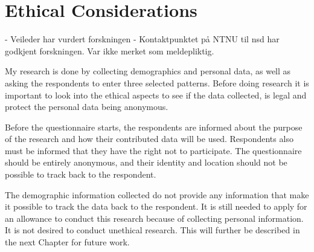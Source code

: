\section{Ethical Considerations}\label{sec:ethics}
    
    - Veileder har vurdert forskningen
    - Kontaktpunktet på NTNU til nsd har godkjent forskningen. Var ikke merket som meldepliktig.

    My research is done by collecting demographics and personal data, as well as asking the respondents to enter three selected patterns. Before doing research it is important to look into the ethical aspects to see if the data collected, is legal and protect the personal data being anonymous.

    Before the questionnaire starts, the respondents are informed about the purpose of the research and how their contributed data will be used. Respondents also must be informed that they have the right not to participate. The questionnaire should be entirely anonymous, and their identity and location should not be possible to track back to the respondent.

    The demographic information collected do not provide any information that make it possible to track the data back to the respondent. It is still needed to apply for an allowance to conduct this research because of collecting personal information. It is not desired to conduct unethical research. This will further be described in the next Chapter for future work.



